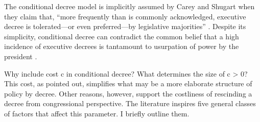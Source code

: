 The conditional decree model is implicitly assumed by Carey and Shugart when they claim that, ``more frequently than is commonly acknowledged, executive decree is tolerated---or even preferred---by legislative majorities'' \citeyearpar[][2]{carey.shugart.1998a}.  Despite its simplicity, conditional decree can contradict the common belief that a high incidence of executive decrees is tantamount to usurpation of power by the president \citep[eg.][]{odonnell.1994}.  

Why include cost c in conditional decree?  What determines the size of c > 0?  This cost, as pointed out, simplifies what may be a more elaborate structure of policy by decree.  Other reasons, however, support the costliness of rescinding a decree from congressional perspective.  The literature inspires five general classes of factors that affect this parameter.  I briefly outline them.  

